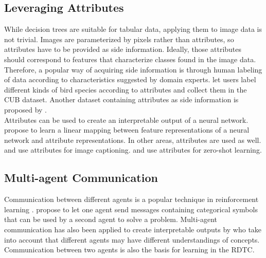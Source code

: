 \documentclass[a4paper,cleardoubleempty,BCOR1cm, 11pt]{report}
\begin{document}
\subsection{Leveraging Attributes}
While decision trees are suitable for tabular data, applying them to image data is not trivial. Images are parameterized by pixels rather than attributes, so attributes have to be provided as side information. Ideally, those attributes should correspond to features that characterize classes found in the image data. Therefore, a popular way of acquiring side information is through human labeling of data according to characteristics suggested by domain experts. \citet{WahCUB_200_2011} let users label different kinds of bird species according to attributes and collect them in the CUB dataset. Another dataset containing attributes as side information is proposed by \citet{8413121}.\\
Attributes can be used to create an interpretable output of a neural network. \citet{akata2013label} propose to learn a linear mapping between feature representations of a neural network and attribute representations.
In other areas, attributes are used as well. \citet{kulkarni2013babytalk} and \citet{ordonez2011im2text} use attributes for image captioning. \citet{lampert2009learning} and \citet{palatucci2009zero} use attributes for zero-shot learning.


\subsection{Multi-agent Communication}
Communication between different agents is a popular technique in reinforcement learning \cite{havrylov2017emergence, lazaridou2018emergence, cao2018emergent, jiang2018learning, das2019tarmac}. \citet{foerster2016learning} propose to let one agent send messages containing categorical symbols that can be used by a second agent to solve a problem. Multi-agent communication has also been applied to create interpretable outputs by \citet{rodriguez2019modeling} who take into account that different agents may have different understandings of concepts. Communication between two agents is also the basis for learning in the RDTC.
\end{document}
